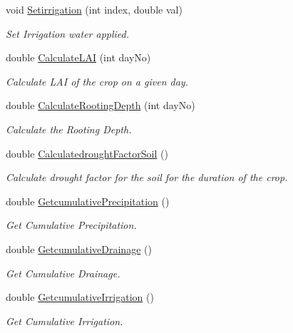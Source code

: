 \begin{DoxyCompactItemize}
void \mbox{\hyperlink{class_crop_class_a3aebb49399ede5f75a08b00b492f005c}{Setirrigation}} (int index, double val)
\begin{DoxyCompactList}\small\item\em Set Irrigation water applied. \end{DoxyCompactList}\item 
double \mbox{\hyperlink{class_crop_class_a326d0d9193c44baa7e949bdcec4c352d}{Calculate\+L\+AI}} (int day\+No)
\begin{DoxyCompactList}\small\item\em Calculate L\+AI of the crop on a given day. \end{DoxyCompactList}\item 
double \mbox{\hyperlink{class_crop_class_ac0fd8bf1d136cdfdc45a9e28fdfa4e1e}{Calculate\+Rooting\+Depth}} (int day\+No)
\begin{DoxyCompactList}\small\item\em Calculate the Rooting Depth. \end{DoxyCompactList}\item 
double \mbox{\hyperlink{class_crop_class_a49c2ae9676cb0ef0a7127cfcafe404a6}{Calculatedrought\+Factor\+Soil}} ()
\begin{DoxyCompactList}\small\item\em Calculate drought factor for the soil for the duration of the crop. \end{DoxyCompactList}\item 
double \mbox{\hyperlink{class_crop_class_a0676d46f97d4a0a5e8f48721611b2184}{Getcumulative\+Precipitation}} ()
\begin{DoxyCompactList}\small\item\em Get Cumulative Precipitation. \end{DoxyCompactList}\item 
double \mbox{\hyperlink{class_crop_class_a6d1f5ebe9d9f9c5e218f2ebaeb9dd959}{Getcumulative\+Drainage}} ()
\begin{DoxyCompactList}\small\item\em Get Cumulative Drainage. \end{DoxyCompactList}\item 
double \mbox{\hyperlink{class_crop_class_a744025c0a7e2f951975d59a4fa49a5e7}{Getcumulative\+Irrigation}} ()
\begin{DoxyCompactList}\small\item\em Get Cumulative Irrigation. \end{DoxyCompactList}\item 

\end{DoxyCompactItemize}
